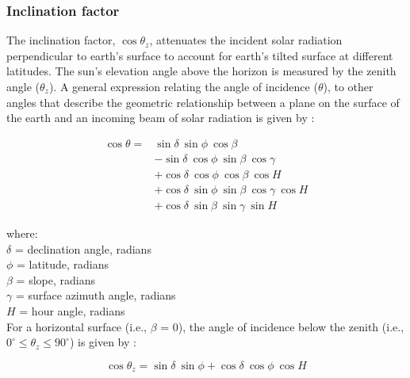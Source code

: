 \subsubsection{Inclination factor}
\label{sec:cosz}
The inclination factor, $\cos \theta_z$, attenuates the incident solar radiation perpendicular to earth's surface to account for earth's tilted surface at different latitudes. 
The sun's elevation angle above the horizon is measured by the zenith angle ($\theta_z$). 
A general expression relating the angle of incidence ($\theta$), to other angles that describe the geometric relationship between a plane on the surface of the earth and an incoming beam of solar radiation is given by \parencite[Eq. 1.6.2]{duffie13}:

\begin{equation}
\label{eq:theta}
    \begin{split}
    	\cos \theta = & \sin\delta\: \sin\phi\: \cos\beta \\
            & - \sin\delta\: \cos\phi\: \sin\beta\: \cos\gamma \\
            & + \cos\delta\: \cos\phi\: \cos\beta\: \cos H \\
            & + \cos\delta\: \sin\phi\: \sin\beta\: \cos\gamma\: \cos H \\
            & + \cos\delta\: \sin\beta\: \sin\gamma\: \sin H
    \end{split}
\end{equation}

\noindent where: \\
\indent $\delta$ = declination angle, radians \\
\indent $\phi$ = latitude, radians \\
\indent $\beta$ = slope, radians \\
\indent $\gamma$ = surface azimuth angle, radians \\
\indent $H$ = hour angle, radians \\

For a horizontal surface (i.e., $\beta$ = 0), the angle of incidence below the zenith (i.e., $0^{\circ} \leq \theta_z \leq 90^{\circ}$) is given by \parencite{wetherald72, duffie13, loutre03}:

\begin{equation}
\label{eq:thetaz}
	\cos \theta_z = \sin\delta\: \sin\phi + 
	                \cos\delta\: \cos\phi\: \cos H
\end{equation}

